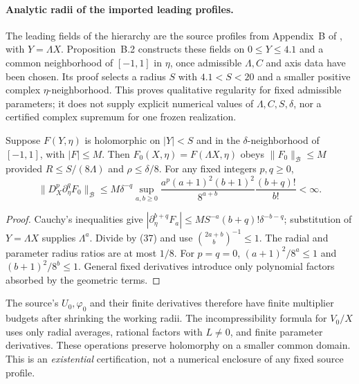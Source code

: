\paragraph{Analytic radii of the imported leading profiles.}
The leading fields of the hierarchy are the source profiles from
Appendix~B of \cite{openai2026}, with $Y=\Lambda X$.
Proposition~B.2 constructs these fields on $0\le Y\le4.1$
and a common neighborhood of $[-1,1]$ in $\eta$, once
admissible $\Lambda,C$ and axis data have been chosen. Its
proof selects a radius $S$ with $4.1<S<20$ and a smaller
positive complex $\eta$-neighborhood. This proves qualitative
regularity for fixed admissible parameters; it does not supply
explicit numerical values of $\Lambda,C,S,\delta$, nor a
certified complex supremum for one frozen realization.

\begin{lemma}
\label{lem:source-radius-transfer}
Suppose $F(Y,\eta)$ is holomorphic on $|Y|<S$ and in
the $\delta$-neighborhood of $[-1,1]$, with $|F|\le M$.
Then $F_0(X,\eta)=F(\Lambda X,\eta)$ obeys
$\|F_0\|_{\mathcal B}\le M$ provided
$R\le S/(8\Lambda)$ and $\rho\le\delta/8$.
For any fixed integers $p,q\ge0$,
\begin{equation}\label{eq:source-Cauchy-bound}
\|D_X^p\partial_\eta^qF_0\|_{\mathcal B}
\le M\delta^{-q}\sup_{a,b\ge0}
\frac{a^p(a+1)^2(b+1)^2}{8^{a+b}}
\frac{(b+q)!}{b!}<\infty.
\end{equation}
\end{lemma}
\begin{proof}
Cauchy's inequalities give
$|\partial_\eta^{b+q}F_a|\le MS^{-a}(b+q)!\delta^{-b-q}$;
substitution of $Y=\Lambda X$ supplies $\Lambda^a$.
Divide by (37) and use $\binom{2a+b}{b}^{-1}\le1$.
The radial and parameter radius ratios are at most $1/8$.
For $p=q=0$, $(a+1)^2/8^a\le1$ and
$(b+1)^2/8^b\le1$. General fixed derivatives introduce
only polynomial factors absorbed by the geometric terms.
\end{proof}
The source's $U_0,\varphi_0$ and their finite derivatives
therefore have finite multiplier budgets after shrinking the
working radii. The incompressibility formula for $V_0/X$
uses only radial averages, rational factors with $L\ne0$,
and finite parameter derivatives. These operations preserve
holomorphy on a smaller common domain. This is an
\emph{existential} certification, not a numerical enclosure
of any fixed source profile.

